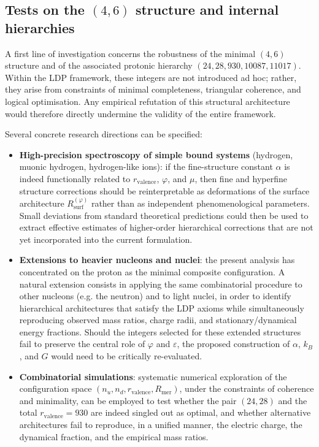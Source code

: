\documentclass[11pt,a4paper]{article}
\begin{document}
\subsection{Tests on the \texorpdfstring{\((4,6)\)}{(4,6)} structure and internal hierarchies}

A first line of investigation concerns the robustness of the minimal \((4,6)\) structure and of the associated protonic hierarchy \((24,28,930,10087,11017)\). Within the LDP framework, these integers are not introduced ad hoc; rather, they arise from constraints of minimal completeness, triangular coherence, and logical optimisation. Any empirical refutation of this structural architecture would therefore directly undermine the validity of the entire framework.

Several concrete research directions can be specified:
\begin{itemize}[label=-]
    \item \textbf{High-precision spectroscopy of simple bound systems} (hydrogen, muonic hydrogen, hydrogen-like ions): if the fine-structure constant \(\alpha\) is indeed functionally related to \(r_{\mathrm{valence}}\), \(\varphi\), and \(\mu\), then fine and hyperfine structure corrections should be reinterpretable as deformations of the surface architecture \(R_{\mathrm{surf}}^{(\varphi)}\) rather than as independent phenomenological parameters. Small deviations from standard theoretical predictions could then be used to extract effective estimates of higher-order hierarchical corrections that are not yet incorporated into the current formulation.
    \item \textbf{Extensions to heavier nucleons and nuclei}: the present analysis has concentrated on the proton as the minimal composite configuration. A natural extension consists in applying the same combinatorial procedure to other nucleons (e.g. the neutron) and to light nuclei, in order to identify hierarchical architectures that satisfy the LDP axioms while simultaneously reproducing observed mass ratios, charge radii, and stationary/dynamical energy fractions. Should the integers selected for these extended structures fail to preserve the central role of \(\varphi\) and \(\varepsilon\), the proposed construction of \(\alpha\), \(k_{B}\), and \(G\) would need to be critically re-evaluated.
    \item \textbf{Combinatorial simulations}: systematic numerical exploration of the configuration space \((n_{u}, n_{d}, r_{\mathrm{valence}}, R_{\mathrm{mer}})\), under the constraints of coherence and minimality, can be employed to test whether the pair \((24,28)\) and the total \(r_{\mathrm{valence}} = 930\) are indeed singled out as optimal, and whether alternative architectures fail to reproduce, in a unified manner, the electric charge, the dynamical fraction, and the empirical mass ratios.
\end{itemize}
\end{document}
